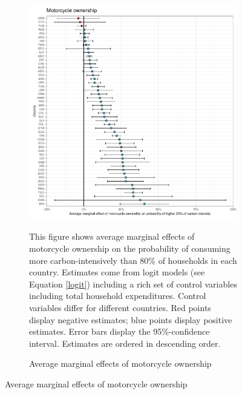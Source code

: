  \begin{figure}[ht!]\ContinuedFloat
   \centering
   \begin{subfigure}[b]{\textwidth}
   \centering
   \includegraphics{1_Figures/Analysis_Logit_Models_Marginal_Effects/Average_Marginal_Effects_affected_upper_80_motorcycle.01_2017B.pdf}
   \caption{Average marginal effects of motorcycle ownership} \label{fig:Logit_ME_motorcycle}
   \begin{subcaption2}
     This figure shows average marginal effects of motorcycle ownership on the probability of consuming more carbon-intensively than 80\% of households in each country. Estimates come from logit models (see Equation \ref{logit}) including a rich set of control variables including total household expenditures. Control variables differ for different countries. Red points display negative estimates; blue points display positive estimates. Error bars display the 95\%-confidence interval. Estimates are ordered in descending order.
   \end{subcaption2}
   \end{subfigure}
 \end{figure}
 \clearpage

